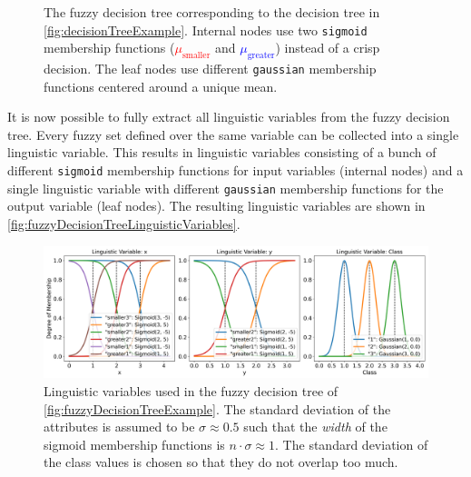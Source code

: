 \begin{figure}[h!]

    \caption[Fuzzy decision tree created from the regular decision tree]{The fuzzy decision tree corresponding to the decision tree in \autoref{fig:decisionTreeExample}. Internal nodes use two \texttt{sigmoid} membership functions (\textcolor{red}{$\mu_{\text{smaller}}$} and \textcolor{blue}{$\mu_{\text{greater}}$}) instead of a crisp decision. The leaf nodes use different \texttt{gaussian} membership functions centered around a unique mean.}

    \label{fig:fuzzyDecisionTreeExample}
\end{figure}

It is now possible to fully extract all linguistic variables from the fuzzy decision tree. Every fuzzy set defined over the same variable can be collected into a single linguistic variable. This results in linguistic variables consisting of a bunch of different \texttt{sigmoid} membership functions for input variables (internal nodes) and a single linguistic variable with different \texttt{gaussian} membership functions for the output variable (leaf nodes). The resulting linguistic variables are shown in \autoref{fig:fuzzyDecisionTreeLinguisticVariables}.


\begin{figure}[h]
    \centering

    \includegraphics[width=\linewidth]{figures/ProofOfConcepts/fuzzy_sets.png}

    \caption[Linguistic variables for the converted fuzzy decision tree]{Linguistic variables used in the fuzzy decision tree of \autoref{fig:fuzzyDecisionTreeExample}. The standard deviation of the attributes is assumed to be $\sigma \approx 0.5$ such that the \emph{width} of the sigmoid membership functions is $n\cdot \sigma \approx 1$. The standard deviation of the class values is chosen so that they do not overlap too much.}
    \label{fig:fuzzyDecisionTreeLinguisticVariables}
\end{figure}

